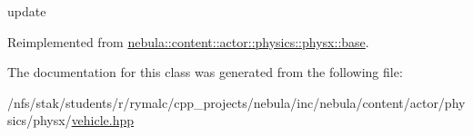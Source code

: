 update 

Reimplemented from \hyperlink{classnebula_1_1content_1_1actor_1_1physics_1_1physx_1_1base_a44919981abb6410c7c635d6e1ea96423}{nebula::content::actor::physics::physx::base}.

The documentation for this class was generated from the following file:\begin{DoxyCompactItemize}
\item 
/nfs/stak/students/r/rymalc/cpp\_\-projects/nebula/inc/nebula/content/actor/physics/physx/\hyperlink{physics_2physx_2vehicle_8hpp}{vehicle.hpp}\end{DoxyCompactItemize}
